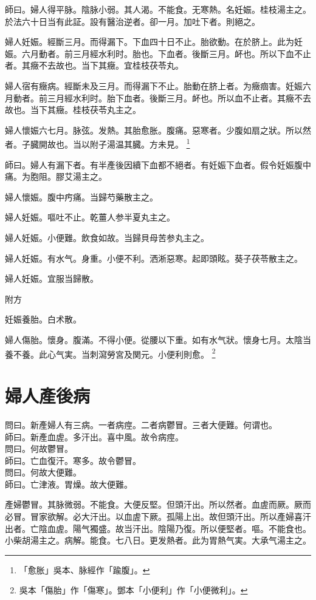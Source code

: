 師曰。婦人得平脉。陰脉小弱。其人渴。不能食。无寒熱。名妊娠。桂枝湯主之。於法六十日当有此証。設有醫治逆者。卻一月。加吐下者。則絕之。{\dengben}

婦人妊娠。經斷三月。而得漏下。下血四十日不止。胎欲動。在於脐上。此为妊娠。六月動者。前三月經水利时。胎也。下血者。後斷三月。衃也。所以下血不止者。其癥不去故也。当下其癥。宜桂枝茯苓丸。{\wuben}

婦人宿有癥病。經斷未及三月。而得漏下不止。胎動在脐上者。为癥痼害。妊娠六月動者。前三月經水利时。胎下血者。後斷三月。衃也。所以血不止者。其癥不去故也。当下其癥。桂枝茯苓丸主之。{\dengben}

婦人懷娠六七月。脉弦。发熱。其胎愈胀。腹痛。惡寒者。少腹如扇之狀。所以然者。子臓開故也。当以附子湯温其臓。{\scriptsize 方未見。}
	\footnote{「愈胀」吳本、脉經作「踰腹」。}

師曰。婦人有漏下者。有半產後因續下血都不絕者。有妊娠下血者。假令妊娠腹中痛。为胞阻。膠艾湯主之。

婦人懷娠。腹中㽲痛。当歸芍藥散主之。

{\khaaitp 婦人}妊娠。嘔吐不止。乾薑人参半夏丸主之。

{\khaaitp 婦人}妊娠。小便難。飲食如故。{\khaaitp 当}歸{\khaaitp 貝}母苦参丸主之。

{\khaaitp 婦人}妊娠。有水气。身重。小便不利。洒淅惡寒。起即頭眩。葵子茯苓散主之。

婦人妊娠。宜服当歸散。

附方

妊娠養胎。白术散。

婦人傷胎。懷身。腹滿。不得小便。從腰以下重。如有水气狀。懷身七月。太陰当養不養。此心气実。当刺瀉勞宮及関元。小便利則愈。
	\footnote{吳本「傷胎」作「傷寒」。鄧本「小便利」作「小便微利」。}

\chapter{婦人產後病}

問曰。新產婦人有三病。一者病痙。二者病鬱冒。三者大便難。何谓也。\\
師曰。新產血虗。多汗出。喜中風。故令病痙。\\
{\khaaitp 問曰。何故鬱冒。}\\
{\khaaitp 師曰。}亡血復汗。寒多。故令鬱冒。\\
{\khaaitp 問曰。何故大便難。}\\
{\khaaitp 師曰。}亡津液。胃燥。故大便難。

產婦鬱{\khaaitp 冒}。其脉微弱。不能食。大便反堅。但頭汗出。所以然者。血虗而厥。厥而必冒。冒家欲解。必大汗出。以血虗下厥。孤陽上出。故但頭汗出。所以產婦喜汗出者。亡陰血虗。陽气獨盛。故当汗出。陰陽乃復。所以便堅者。嘔。不能食也。小柴胡湯主之。病解。能食。七八日。更发熱者。此为胃熱气実。大承气湯主之。{\wuben}


